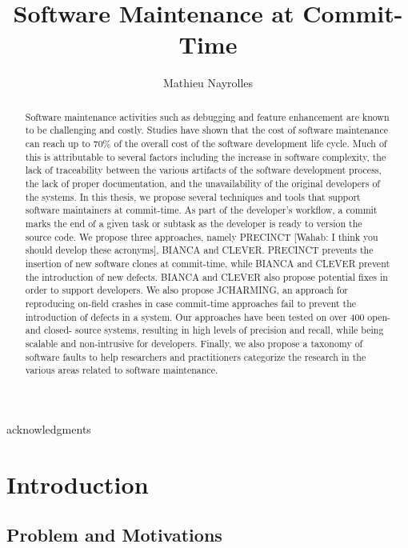\documentclass[12pt]{report}
\author{Mathieu Nayrolles}
\title{Software Maintenance at Commit-Time}
\begin{document}
\begin{abstract}
  Software maintenance activities such as debugging and feature
  enhancement are known to be challenging and costly. Studies have shown
  that the cost of software maintenance can reach up to 70\% of the
  overall cost of the software development life cycle. Much of this is
  attributable to several factors including the increase in software
  complexity, the lack of traceability between the various artifacts of
  the software development process, the lack of proper documentation, and
  the unavailability of the original developers of the systems. In this thesis,
  we propose several techniques and tools that support software maintainers at
  commit-time. As part of the developer's workflow, a commit marks the end
  of a given task or subtask as the developer is ready to version the
  source code. We propose three
  approaches, namely PRECINCT [Wahab: I think you should develop these acronyms], BIANCA and CLEVER. PRECINCT prevents the
  insertion of new software clones at commit-time, while BIANCA and CLEVER
  prevent the introduction of new defects. BIANCA and
  CLEVER also propose potential fixes in order to
  support developers. We also propose JCHARMING, an approach for reproducing
  on-field crashes in case commit-time approaches fail to prevent the
  introduction of defects in a system. Our approaches have
  been tested on over 400 open- and closed- source systems, resulting in high
  levels of precision and recall, while being scalable and non-intrusive
  for developers. Finally, we also propose a taxonomy of software faults
  to help researchers and practitioners categorize the research in the various
  areas related to software maintenance.
\end{abstract}

\begin{acknowledgments}
  acknowledgments
\end{acknowledgments}


\chapter{Introduction}

\section{Problem and Motivations}\label{problem-and-motivations}
\end{document}
